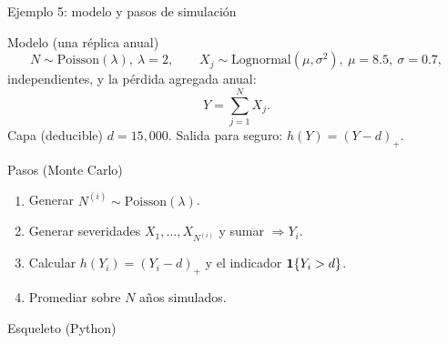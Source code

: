 \documentclass[aspectratio=1610, 9pt]{beamer}
\begin{document}
\begin{frame}[fragile]{Ejemplo 5: modelo y pasos de simulación}
\small
\begin{block}{Modelo (una réplica anual)}
\[
N\sim\mathrm{Poisson}(\lambda),\ \lambda=2,
\qquad
X_j\sim\mathrm{Lognormal}(\mu,\sigma^2),\ \mu=8.5,\ \sigma=0.7,
\]
independientes, y la pérdida agregada anual:
\[
Y=\sum_{j=1}^{N} X_j.
\]
Capa (deducible) $d=15{,}000$. Salida para seguro: $h(Y)=(Y-d)_+$.
\end{block}

\begin{block}{Pasos (Monte Carlo)}
\begin{enumerate}
\item Generar $N^{(i)}\sim\mathrm{Poisson}(\lambda)$.
\item Generar severidades $X_1,\dots,X_{N^{(i)}}$ y sumar $\Rightarrow Y_i$.
\item Calcular $h(Y_i)=(Y_i-d)_+$ y el indicador $\mathbf{1}\{Y_i>d\}$.
\item Promediar sobre $N$ años simulados.
\end{enumerate}
\end{block}

\begin{block}{Esqueleto (Python)}
\end{block}
\end{frame}
\end{document}
